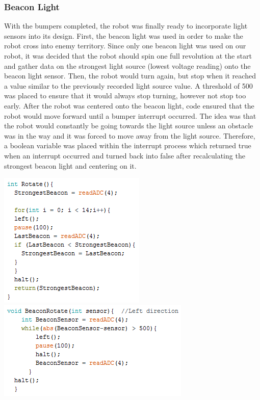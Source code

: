 \documentclass{article}
\begin{document}
    \subsubsection{Beacon Light}
    With the bumpers completed, the robot was finally ready to incorporate light sensors into its design. First, the beacon light was used in order to make the robot cross into enemy territory. Since only one beacon light was used on our robot, it was decided that the robot should spin one full revolution at the start and gather data on the strongest light source (lowest voltage reading) onto the beacon light sensor. Then, the robot would turn again, but stop when it reached a value similar to the previously recorded light source value. A threshold of 500 was placed to ensure that it would always stop turning, however not stop too early. After the robot was centered onto the beacon light, code ensured that the robot would move forward until a bumper interrupt occurred. The idea was that the robot would constantly be going towards the light source unless an obstacle was in the way and it was forced to move away from the light source. Therefore, a boolean variable was placed within the interrupt process which returned true when an interrupt occurred and turned back into false after recalculating the strongest beacon light and centering on it. \\
    
    \begin{center}
    \includegraphics[]{Rotate.png} \\
    \includegraphics[]{BeaconRotate.png} \\
    \end{center}
    
\end{document}
